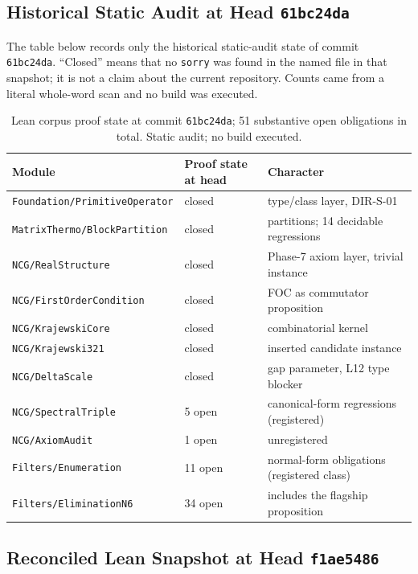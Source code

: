 \documentclass[12pt,a4paper,twoside]{article}
\theoremstyle{plain}
\theoremstyle{definition}
\theoremstyle{remark}
\begin{document}
\subsection{Historical Static Audit at Head \texttt{61bc24da}}
\label{subsec:formalization-status}

The table below records only the historical static-audit state of commit
\texttt{61bc24da}. ``Closed'' means that no \texttt{sorry} was found in the
named file in that snapshot; it is not a claim about the current repository.
Counts came from a literal whole-word scan and no build was executed.

\begin{table}[H]
\centering\small
\begin{tabular}{@{}llp{5.2cm}@{}}
\toprule
Module & Proof state at head & Character \\
\midrule
\texttt{Foundation/PrimitiveOperator} & closed & type/class layer, DIR-S-01 \\
\texttt{MatrixThermo/BlockPartition} & closed & partitions; 14 decidable regressions \\
\texttt{NCG/RealStructure} & closed & Phase-7 axiom layer, trivial instance \\
\texttt{NCG/FirstOrderCondition} & closed & FOC as commutator proposition \\
\texttt{NCG/KrajewskiCore} & closed & combinatorial kernel \\
\texttt{NCG/Krajewski321} & closed & inserted candidate instance \\
\texttt{NCG/DeltaScale} & closed & gap parameter, L12 type blocker \\
\texttt{NCG/SpectralTriple} & 5 open & canonical-form regressions (registered) \\
\texttt{NCG/AxiomAudit} & 1 open & unregistered \\
\texttt{Filters/Enumeration} & 11 open & normal-form obligations (registered class) \\
\texttt{Filters/EliminationN6} & 34 open & includes the flagship proposition \\
\bottomrule
\end{tabular}
\caption{Lean corpus proof state at commit \texttt{61bc24da}; 51
substantive open obligations in total. Static audit; no build executed.}
\label{tab:lean-status}
\end{table}

\newpage
\subsection{Reconciled Lean Snapshot at Head \texttt{f1ae5486}}
\label{subsec:formalization-status-f1ae5486}
\end{document}

